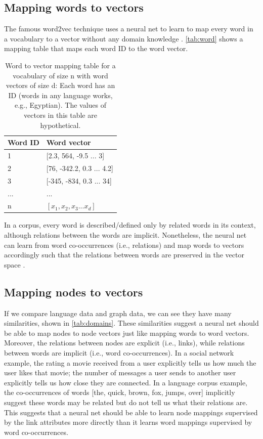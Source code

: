 \documentclass{article}
\begin{document}
\subsection{Mapping words to vectors}
The famous word2vec technique uses a neural net to learn to map every word in a 
vocabulary to a vector without any domain knowledge \cite{mikolov2013efficient}.
\autoref{tab:word} shows a mapping table that maps each word ID to the word 
vector.
\begin{table}[h]
	\centering
	\caption{Word to vector mapping table for a vocabulary of size n with word 
		vectors of size d:
		Each word has an ID (words in any language works, e.g., Egyptian).
		The values of vectors in this table are hypothetical.}
	\begin{tabularx}{0.5\textwidth}{|X|X|} \hline
		\textbf{Word ID} & \textbf{Word vector} \\ \hline
		1 & [2.3, 564, -9.5 ... 3] \\ \hline
		2 & [76, -342.2, 0.3 ... 4.2] \\ \hline
		3 & [-345, -834, 0.3 ... 34] \\ \hline
		... & ... \\ \hline
		n & $ [x_1, x_2, x_3 ... x_d] $ \\ \hline
	\end{tabularx}
	\label{tab:word}
\end{table}
In a corpus, every word is described/defined only by related words in its 
context, although relations between the words are implicit. 
Nonetheless, the neural net can learn from word co-occurrences (i.e., 
relations) and map words to vectors accordingly such that the relations between 
words are preserved in the vector space \cite{mikolov2013distributed}.

\subsection{Mapping nodes to vectors}
If we compare language data and graph data, we can see they have many 
similarities, shown in \autoref{tab:domains}.
These similarities suggest a neural net should be able to map nodes to node 
vectors just like mapping words to word vectors.
Moreover, the relations between nodes are explicit (i.e., links),
while relations between words are implicit (i.e., word co-occurrences).
In a social network example, the rating a movie received from a user explicitly 
tells us how much the user likes that movie; the number of messages a user 
sends to another user explicitly tells us how close they are connected.
In a language corpus example, the co-occurrences of words [the, quick, brown, 
fox, jumps, over] implicitly suggest these words may be related but do not tell 
us what their relations are.
This suggests that a neural net should be able to learn node mappings 
supervised by the link attributes more directly than it learns word mappings 
supervised by word co-occurrences.
\end{document}
